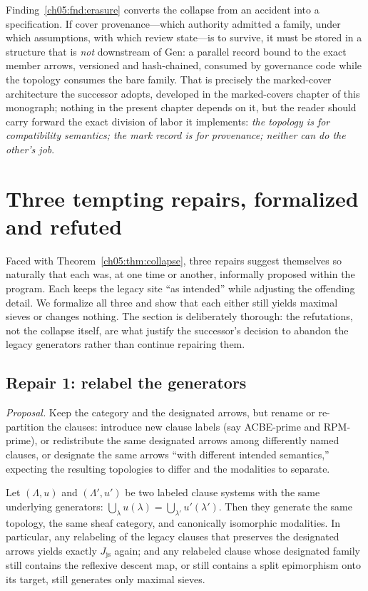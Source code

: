 \begin{remark}\label{ch05:rem:design}
Finding~\ref{ch05:fnd:erasure} converts the collapse from an accident into a
specification. If cover provenance---which authority admitted a family,
under which assumptions, with which review state---is to survive, it must be
stored in a structure that is \emph{not} downstream of $\mathrm{Gen}$: a
parallel record bound to the exact member arrows, versioned and
hash-chained, consumed by governance code while the topology consumes the
bare family. That is precisely the marked-cover architecture the successor
adopts, developed in the marked-covers chapter of this monograph; nothing in
the present chapter depends on it, but the reader should carry forward the
exact division of labor it implements: \emph{the topology is for
compatibility semantics; the mark record is for provenance; neither can do
the other's job}.
\end{remark}

\section{Three tempting repairs, formalized and refuted}
\label{ch05:sec:repairs}

Faced with Theorem~\ref{ch05:thm:collapse}, three repairs suggest themselves
so naturally that each was, at one time or another, informally proposed
within the program. Each keeps the legacy site ``as intended'' while
adjusting the offending detail. We formalize all three and show that each
either still yields maximal sieves or changes nothing. The section is
deliberately thorough: the refutations, not the collapse itself, are what
justify the successor's decision to abandon the legacy generators rather
than continue repairing them.

\subsection{Repair 1: relabel the generators}\label{ch05:sub:repair1}

\emph{Proposal.} Keep the category and the designated arrows, but rename or
re-partition the clauses: introduce new clause labels (say
ACBE-prime and RPM-prime), or redistribute the same designated arrows among
differently named clauses, or designate the same arrows ``with different
intended semantics,'' expecting the resulting topologies to differ and the
modalities to separate.

\begin{proposition}\label{ch05:prop:repair1}
Let $(\Lambda,u)$ and $(\Lambda',u')$ be two labeled clause systems with the
same underlying generators:
$\bigcup_{\lambda}u(\lambda)=\bigcup_{\lambda'}u'(\lambda')$. Then they
generate the same topology, the same sheaf category, and canonically
isomorphic modalities. In particular, any relabeling of the legacy clauses
that preserves the designated arrows yields exactly
$J_{\mathrm{js}}$ again; and any relabeled clause whose designated family
still contains the reflexive descent map, or still contains a split
epimorphism onto its target, still generates only maximal sieves.
\end{proposition}


